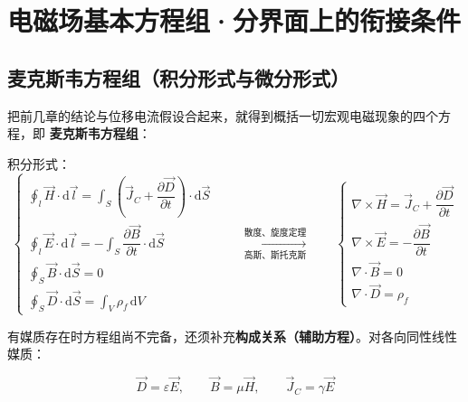 
\section{电磁场基本方程组·分界面上的衔接条件}

\subsection{麦克斯韦方程组（积分形式与微分形式）}

把前几章的结论与位移电流假设合起来，就得到概括一切宏观电磁现象的四个方程，即
\textbf{麦克斯韦方程组}：

\begin{formulaBox}
积分形式：
\[
\begin{cases}
\displaystyle\oint_{l}\vec{H}\cdot \mathrm{d}\vec{l}
=\int_{S}\left(\vec{J}_C+\dfrac{\partial \vec{D}}{\partial t}\right)\cdot \mathrm{d}\vec{S}\\[10pt]
\displaystyle\oint_{l}\vec{E}\cdot \mathrm{d}\vec{l}
=-\int_{S}\dfrac{\partial \vec{B}}{\partial t}\cdot \mathrm{d}\vec{S}\\[10pt]
\displaystyle\oint_{S}\vec{B}\cdot \mathrm{d}\vec{S}=0\\[10pt]
\displaystyle\oint_{S}\vec{D}\cdot \mathrm{d}\vec{S}=\int_{V}\rho_f\,\mathrm{d}V
\end{cases}
\qquad\xrightarrow[\text{高斯、斯托克斯}]{\text{散度、旋度定理}}\qquad
\begin{cases}
\nabla\times \vec{H}=\vec{J}_C+\dfrac{\partial \vec{D}}{\partial t}\\[8pt]
\nabla\times \vec{E}=-\dfrac{\partial \vec{B}}{\partial t}\\[8pt]
\nabla\cdot \vec{B}=0\\[8pt]
\nabla\cdot \vec{D}=\rho_f
\end{cases}
\]
\end{formulaBox}

有媒质存在时方程组尚不完备，还须补充\textbf{构成关系（辅助方程）}。对各向同性线性媒质：

\begin{formulaBox}
\[
\vec{D}=\varepsilon\vec{E},\qquad \vec{B}=\mu\vec{H},\qquad \vec{J}_C=\gamma\vec{E}
\]
\end{formulaBox}

